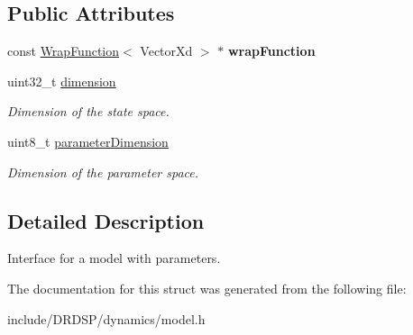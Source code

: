\subsection*{Public Attributes}
\begin{DoxyCompactItemize}
\item 
\hypertarget{struct_d_r_d_s_p_1_1_model_parameterized_a65c8933121ff4801985cea23d00a3b1d}{const \hyperlink{struct_d_r_d_s_p_1_1_wrap_function}{Wrap\-Function}$<$ Vector\-Xd $>$ $\ast$ {\bfseries wrap\-Function}}\label{struct_d_r_d_s_p_1_1_model_parameterized_a65c8933121ff4801985cea23d00a3b1d}

\item 
\hypertarget{struct_d_r_d_s_p_1_1_model_parameterized_a80a78be5602accbde02f804ec1284be8}{uint32\-\_\-t \hyperlink{struct_d_r_d_s_p_1_1_model_parameterized_a80a78be5602accbde02f804ec1284be8}{dimension}}\label{struct_d_r_d_s_p_1_1_model_parameterized_a80a78be5602accbde02f804ec1284be8}

\begin{DoxyCompactList}\small\item\em Dimension of the state space. \end{DoxyCompactList}\item 
\hypertarget{struct_d_r_d_s_p_1_1_model_parameterized_a0ac0ef55c53f1b2361c32b9594ad081e}{uint8\-\_\-t \hyperlink{struct_d_r_d_s_p_1_1_model_parameterized_a0ac0ef55c53f1b2361c32b9594ad081e}{parameter\-Dimension}}\label{struct_d_r_d_s_p_1_1_model_parameterized_a0ac0ef55c53f1b2361c32b9594ad081e}

\begin{DoxyCompactList}\small\item\em Dimension of the parameter space. \end{DoxyCompactList}\end{DoxyCompactItemize}


\subsection{Detailed Description}
Interface for a model with parameters. 

The documentation for this struct was generated from the following file\-:\begin{DoxyCompactItemize}
\item 
include/\-D\-R\-D\-S\-P/dynamics/model.\-h\end{DoxyCompactItemize}
